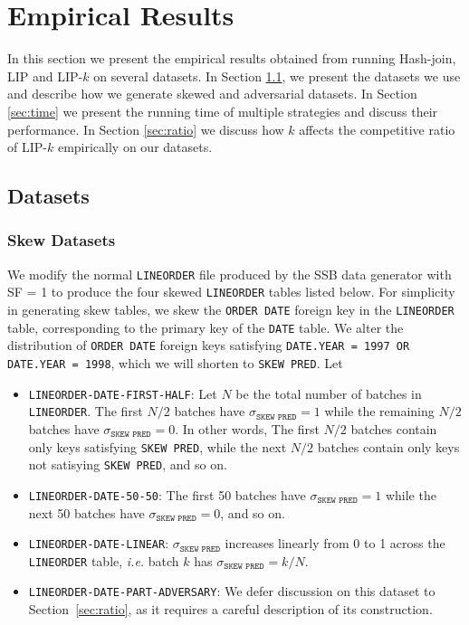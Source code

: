 \section{Empirical Results}\label{sec:experiment}

In this section we present the empirical results obtained from running Hash-join, LIP and LIP-$k$ on several datasets. In Section \ref{sec:dataset}, we present the datasets we use and describe how we generate skewed and adversarial datasets. In Section \ref{sec:time} we present the running time of multiple strategies and discuss their performance. In Section \ref{sec:ratio} we discuss how $k$ affects the competitive ratio of LIP-$k$ empirically on our datasets.

\subsection{Datasets}
\label{sec:dataset}


\subsubsection{Skew Datasets}

We modify the normal \texttt{LINEORDER} file produced by the SSB data generator with SF = 1 to produce the four skewed \texttt{LINEORDER} tables listed below.
For simplicity in generating skew tables, we skew the \texttt{ORDER DATE} foreign key in the \texttt{LINEORDER} table, corresponding to the primary key of the \texttt{DATE} table. 
We alter the distribution of \texttt{ORDER DATE} foreign keys satisfying \texttt{DATE.YEAR = 1997 OR DATE.YEAR = 1998}, which we will shorten to \texttt{SKEW PRED}.
Let 

\begin{itemize}
    \item \texttt{LINEORDER-DATE-FIRST-HALF}: Let $N$ be the total number of batches in \texttt{LINEORDER}. 
    The first $N/2$ batches have $\sigma_{\texttt{SKEW PRED}} = 1$ while the remaining $N/2$ batches have $\sigma_{\texttt{SKEW PRED}} = 0$.
    In other words, The first $N/2$ batches contain only keys satisfying \texttt{SKEW PRED}, 
    while the next $N/2$ batches contain only keys not satisying \texttt{SKEW PRED}, 
    and so on. 

    \item \texttt{LINEORDER-DATE-50-50}: The first 50 batches have $\sigma_{\texttt{SKEW PRED}} = 1$ while the next 50 batches have $\sigma_{\texttt{SKEW PRED}} = 0$, and so on.

    \item \texttt{LINEORDER-DATE-LINEAR}: $\sigma_{\texttt{SKEW PRED}}$ increases linearly from 0 to 1 across the \texttt{LINEORDER} table, 
    {\it i.e.} batch $k$ has $\sigma_{\texttt{SKEW PRED}} = k/N$.

    \item \texttt{LINEORDER-DATE-PART-ADVERSARY}: We defer discussion on this dataset to Section~\ref{sec:ratio}, 
    as it requires a careful description of its construction.

\end{itemize} 


